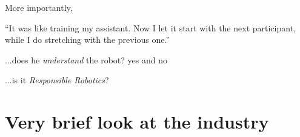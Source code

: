 \documentclass[xcolor=table,aspectratio=169]{beamer}
\begin{document}
\begin{frame}{}

    More importantly,

    \vspace{2em}

    \begin{center}

    \large{``It was like training my assistant. Now I let it start with the
    next participant, while I do stretching with the previous one.''}

    \end{center}

    \vspace{2em}

    \pause

    ...does he \emph{understand} the robot? \footnotesize{yes and no}

    \pause

    \normalsize ...is it \emph{Responsible Robotics\textcopyright}?

\end{frame}


\section*{Very brief look at the industry}
\end{document}
